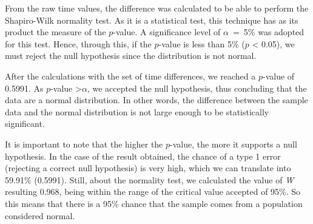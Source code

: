 From the raw time values, the difference was calculated to be able to perform the Shapiro-Wilk normality test.
As it is a statistical test, this technique has as its product the measure of the $p$-value.
A significance level of $\alpha$~=~5\% was adopted for this test.
Hence, through this, if the $p$-value is less than 5\% ($p$ < 0.05), we must reject the null hypothesis since the distribution is not normal.

After the calculations with the set of time differences, we reached a $p$-value of 0.5991.
As $p$-value \textgreater $\alpha$, we accepted the null hypothesis, thus concluding that the data are a normal distribution.
In other words, the difference between the sample data and the normal distribution is not large enough to be statistically significant.

It is important to note that the higher the $p$-value, the more it supports a null hypothesis.
In the case of the result obtained, the chance of a type 1 error (rejecting a correct null hypothesis) is very high, which we can translate into 59.91\% (0.5991).
Still, about the normality test, we calculated the value of \textit{W} resulting 0.968, being within the range of the critical value accepted of 95\%.
So this means that there is a 95\% chance that the sample comes from a  population considered normal.

